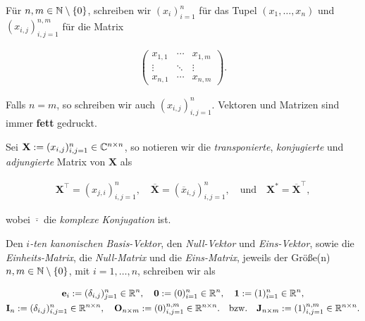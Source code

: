             Für $n, m \in \mathbb N \setminus {\left \{ 0 \right \}}$, schreiben wir $(x_i)_{i=1}^n$ für das Tupel $(x_1, \dots, x_n)$ und $(x_{i, j})_{i, j = 1}^{n, m}$ für die Matrix

            \begin{align*}
                \begin{pmatrix}
                    x_{1, 1} & \cdots & x_{1, m} \\
                    \vdots   & \ddots & \vdots   \\
                    x_{n, 1} & \cdots & x_{n, m}
                \end{pmatrix}.
            \end{align*}

            Falls $n = m$, so schreiben wir auch $(x_{i, j})_{i, j = 1}^n$.
            Vektoren und Matrizen sind immer \textbf{fett} gedruckt.

            Sei $\mathbf X := (x_{i, j})_{i, j = 1}^n \in \mathbb C^{n \times n}$, so notieren wir die \textit{transponierte}, \textit{konjugierte} und \textit{adjungierte} Matrix von $\mathbf X$ als

            \begin{align*}
                \mathbf X^\top = (x_{j, i})_{i, j = 1}^n,
                \quad
                \overline {\mathbf X} = (\overline x_{i, j})_{i, j = 1}^n,
                \quad
                \text{und}
                \quad
                \mathbf X^\ast = \overline {\mathbf X}^\top,
            \end{align*}

            wobei $\overline \cdot$ die \textit{komplexe Konjugation} ist.

            Den \textit{$i$-ten kanonischen Basis-Vektor}, den \textit{Null-Vektor} und \textit{Eins-Vektor}, sowie die \textit{Einheits-Matrix}, die \textit{Null-Matrix} und die \textit{Eins-Matrix}, jeweils der Größe(n) $n, m \in \mathbb N \setminus {\left \{ 0 \right \}}$, mit $i = 1, \dots, n$, schreiben wir als

            \begin{gather*}
                \mathbf e_i := (\delta_{i,j})_{j=1}^n \in \mathbb R^n,
                \quad
                \mathbf 0 := (0)_{i=1}^n \in \mathbb R^n,
                \quad
                \mathbf 1 := (1)_{i=1}^n \in \mathbb R^n, \\
                \mathbf I_n := (\delta_{i, j})_{i,j=1}^n \in \mathbb R^{n \times n},
                \quad
                \mathbf O_{n \times m} := (0)_{i,j=1}^{n,m} \in \mathbb R^{n \times n}.
                \quad
                \text{bzw.}
                \quad
                \mathbf J_{n \times m} := (1)_{i,j=1}^{n,m} \in \mathbb R^{n \times n}.
            \end{gather*}

